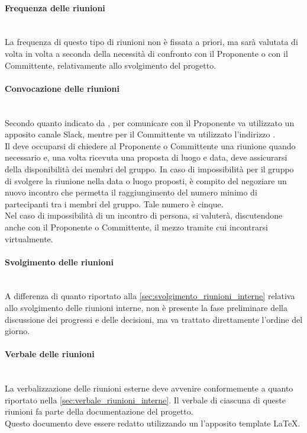 \paragraph{Frequenza delle riunioni}\mbox{}\\
La frequenza di questo tipo di riunioni non è fissata a priori, ma sarà valutata di volta in volta a seconda della necessità di confronto con il Proponente o con il Committente, relativamente allo svolgimento del progetto.

\paragraph{Convocazione delle riunioni}\mbox{}\\
Secondo quanto indicato da \Proponente, per comunicare con il Proponente va utilizzato un apposito canale Slack, mentre per il Committente va utilizzato l'indirizzo \email{} \href{mailto:\GroupEmail}{\GroupEmail}.\\
Il \Responsabile{} deve occuparsi di chiedere al Proponente o Committente una riunione quando necessario e, una volta ricevuta una proposta di luogo e data, deve assicurarsi della disponibilità dei membri del gruppo. In caso di impossibilità per il gruppo di svolgere la riunione nella data o luogo proposti, è compito del \Responsabile{} negoziare un nuovo incontro che permetta il raggiungimento del numero minimo di partecipanti tra i membri del gruppo. Tale numero è cinque.\\
Nel caso di impossibilità di un incontro di persona, si valuterà, discutendone anche con il Proponente o Committente, il mezzo tramite cui incontrarsi virtualmente.

\paragraph{Svolgimento delle riunioni}\mbox{}\\
A differenza di quanto riportato alla \sezione \ref{sec:svolgimento_riunioni_interne} relativa allo svolgimento delle riunioni interne, non è presente la fase preliminare della discussione dei progressi e delle decisioni, ma va trattato direttamente l'ordine del giorno.

\paragraph{Verbale delle riunioni}\mbox{}\\
La verbalizzazione delle riunioni esterne deve avvenire conformemente a quanto riportato nella \sezione \ref{sec:verbale_riunioni_interne}. Il verbale di ciascuna di queste riunioni fa parte della documentazione del progetto.\\
Questo documento deve essere redatto utilizzando un l'apposito template \LaTeX.

